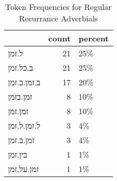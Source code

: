 \begin{table}[htbp!]
\centering
\caption{Token Frequencies for Regular Recurrance Adverbials}
\label{table:regtk_cp}
\begin{tabular}{lrl}
\toprule
{} &  count & percent \\
\midrule
ל.זמן       &     21 &     25\% \\
ב.כל.זמן    &     21 &     25\% \\
ב.זמן.ב.זמן &     17 &     20\% \\
זמן.בזמן    &      8 &     10\% \\
זמן.זמן     &      8 &     10\% \\
ל.זמן.ל.זמן &      3 &      4\% \\
זמן.ב.זמן   &      3 &      4\% \\
בין.זמן     &      1 &      1\% \\
זמן.על.זמן  &      1 &      1\% \\
\bottomrule
\end{tabular}
\end{table}
